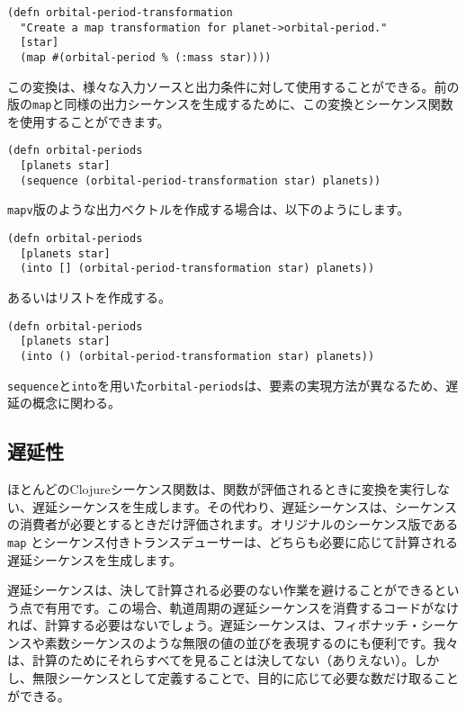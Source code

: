 \begin{lstlisting}[numbers=none]
(defn orbital-period-transformation
  "Create a map transformation for planet->orbital-period."
  [star]
  (map #(orbital-period % (:mass star))))
\end{lstlisting}

この変換は、様々な入力ソースと出力条件に対して使用することができる。前の版の\texttt{map}と同様の出力シーケンスを生成するために、この変換とシーケンス関数を使用することができます。

\begin{lstlisting}[numbers=none]
(defn orbital-periods
  [planets star]
  (sequence (orbital-period-transformation star) planets))
\end{lstlisting}

\texttt{mapv}版のような出力ベクトルを作成する場合は、以下のようにします。

\begin{lstlisting}[numbers=none]
(defn orbital-periods
  [planets star]
  (into [] (orbital-period-transformation star) planets))
\end{lstlisting}

あるいはリストを作成する。

\begin{lstlisting}[numbers=none]
(defn orbital-periods
  [planets star]
  (into () (orbital-period-transformation star) planets))
\end{lstlisting}

\texttt{sequence}と\texttt{into}を用いた\texttt{orbital-periods}は、要素の実現方法が異なるため、遅延の概念に関わる。




\subsection{遅延性}

ほとんどのClojureシーケンス関数は、関数が評価されるときに変換を実行しない、遅延シーケンスを生成します。その代わり、遅延シーケンスは、シーケンスの消費者が必要とするときだけ評価されます。オリジナルのシーケンス版である \texttt{map} とシーケンス付きトランスデューサーは、どちらも必要に応じて計算される遅延シーケンスを生成します。

遅延シーケンスは、決して計算される必要のない作業を避けることができるという点で有用です。この場合、軌道周期の遅延シーケンスを消費するコードがなければ、計算する必要はないでしょう。遅延シーケンスは、フィボナッチ・シーケンスや素数シーケンスのような無限の値の並びを表現するのにも便利です。我々は、計算のためにそれらすべてを見ることは決してない（ありえない）。しかし、無限シーケンスとして定義することで、目的に応じて必要な数だけ取ることができる。

